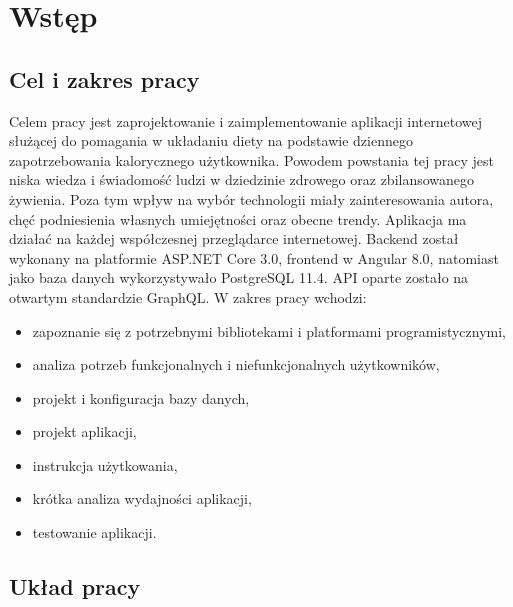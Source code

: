 \chapter{Wstęp}
\section{Cel i zakres pracy}
Celem pracy jest zaprojektowanie i zaimplementowanie aplikacji internetowej służącej do pomagania w układaniu diety na podstawie dziennego zapotrzebowania kalorycznego użytkownika. Powodem powstania tej pracy jest niska wiedza i świadomość ludzi w dziedzinie zdrowego oraz zbilansowanego żywienia.\cite{zywienie} Poza tym wpływ na wybór technologii miały zainteresowania autora, chęć podniesienia własnych umiejętności oraz obecne trendy.\cite{stack} Aplikacja ma działać na każdej współczesnej przeglądarce internetowej. Backend został wykonany na platformie ASP.NET Core 3.0, frontend w Angular 8.0, natomiast jako baza danych wykorzystywało  PostgreSQL 11.4. API oparte zostało na otwartym standardzie GraphQL. W zakres pracy wchodzi:
\begin{itemize}
    \item zapoznanie się z potrzebnymi bibliotekami i platformami programistycznymi,
    \item analiza potrzeb funkcjonalnych i niefunkcjonalnych użytkowników,
    \item projekt i konfiguracja bazy danych,
    \item projekt aplikacji,
    \item instrukcja użytkowania,
    \item krótka analiza wydajności aplikacji,
    \item testowanie aplikacji.
\end{itemize}
\section{Układ pracy}


